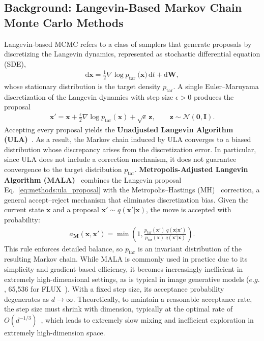 \subsection{Background: Langevin-Based Markov Chain Monte Carlo Methods}
\label{sec:backgounds:mcmc}
Langevin‑based MCMC refers to a class of samplers that generate proposals by discretizing the Langevin dynamics, represented as stochastic differential equation (SDE), 
\begin{align}
    \label{eq:methods:langevin dynamics}
     \mathrm{d}\mathbf{x} = \frac{1}{2}\nabla\log p_{\text{tar }}\!\bigl(\mathbf{x}\bigr)\,\mathrm{d}t + \mathrm{d}\mathbf{W},
\end{align}
whose stationary distribution is the target density \(p_{\text{tar}}\).
A single Euler–Maruyama discretization of the Langevin dynamics with step size \(\epsilon>0\) produces the proposal
\begin{align}
  \label{eq:methods:ula_proposal}
  \mathbf{x}'= \mathbf{x} + \frac{\epsilon}{2}\nabla\log p_{\text{tar}}(\mathbf{x})
  + \sqrt{\epsilon}\,\mathbf{z}, \qquad  \mathbf{z}\sim\mathcal{N}(\mathbf{0},\mathbf{I}).
\end{align}
Accepting every proposal yields the \textbf{Unadjusted Langevin Algorithm (ULA)}~\cite{bj/1178291835}. As a result, the Markov chain induced by ULA converges to a biased distribution whose discrepancy arises from the discretization error. 
In particular, since ULA does not include a correction mechanism, it does not guarantee convergence to the target distribution $p_{\text{tar}}$. \textbf{Metropolis-Adjusted Langevin Algorithm (MALA)}~\cite{bj/1178291835, roberts2002langevin} combines the Langevin proposal Eq.~\ref{eq:methods:ula_proposal} with the Metropolis–Hastings (MH)~\cite{metropolis1953equation, metropolis_hastings} correction, a general accept–reject mechanism that eliminates discretization bias.  
Given the current state \(\mathbf{x}\) and a proposal $\mathbf{x}'\sim q(\mathbf{x}'|\mathbf{x})$, the move is accepted with probability:  
\begin{align}
    \label{eq:sec5:mh correction}
    a_{\textbf{M}}(\mathbf{x},\mathbf{x}')= \min\left(1, \frac{p_{\text{tar}}(\mathbf{x}')\;q(\mathbf{x}|\mathbf{x}')}{p_{\text{tar}}(\mathbf{x})\;q(\mathbf{x}'|\mathbf{x})} \right).
\end{align}
This rule enforces detailed balance, so \(p_{\text{tar}}\) is an invariant distribution of the resulting Markov chain.  
While MALA is commonly used in practice due to its simplicity and gradient-based efficiency, it becomes increasingly inefficient in extremely high-dimensional settings, as is typical in image generative models ($e.g.$, 65,536 for FLUX~\cite{BlackForestLabs:2024Flux}). With a fixed step size, its acceptance probability degenerates as $d\to\infty$. Theoretically, to maintain a reasonable acceptance rate, the step size must shrink with dimension, typically at the optimal rate of $O(d^{-1/3})$~\cite{1c05a07d-e307-3702-9d37-5f716e8c0dbdULAconvergence}, which leads to extremely slow mixing and inefficient exploration in extremely high-dimension space.

